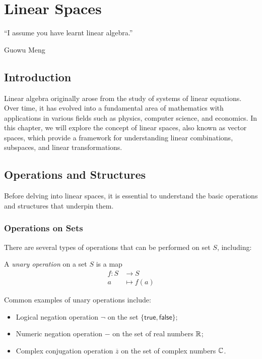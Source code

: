 \chapter{Linear Spaces}

\epigraph{``I assume you have learnt linear algebra.''}{Guowu Meng}

\section{Introduction}

Linear algebra originally arose from the study of systems of linear equations. Over time, it has evolved into a fundamental area of mathematics with applications in various fields such as physics, computer science, and economics. In this chapter, we will explore the concept of linear spaces, also known as vector spaces, which provide a framework for understanding linear combinations, subspaces, and linear transformations.

\section{Operations and Structures}

Before delving into linear spaces, it is essential to understand the basic operations and structures that underpin them.

\subsection{Operations on Sets}

There are several types of operations that can be performed on set $S$, including:

\begin{definition}\label{def:unary_operation}
  A \emph{unary operation} on a set $S$ is a map
  \begin{align*}
    f \colon S & \to S        \\
    a     & \mapsto f(a)
  \end{align*}
\end{definition}

\begin{example}
  Common examples of unary operations include:
  \begin{itemize}
    \item Logical negation operation $\neg$ on the set $\{ \mathsf{true}, \mathsf{false} \}$;
    \item Numeric negation operation $-$ on the set of real numbers $\operatorname{\mathbb{R}}$;
    \item Complex conjugation operation $\overline{z}$ on the set of complex numbers $\operatorname{\mathbb{C}}$.
  \end{itemize}
\end{example}

